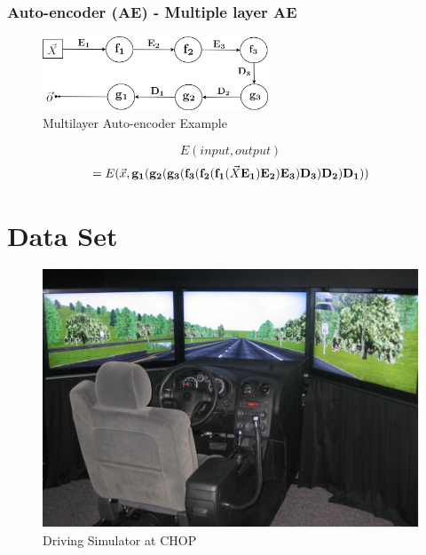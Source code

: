 \documentclass{beamer}
\begin{document}
\begin{frame}
\frametitle{Auto-encoder (AE) - Multiple layer AE}
\begin{figure}[t!]
    \centering
    \includegraphics[width=0.6\textwidth]{../paper/pictures/figures/example_MAE.png}
    \caption{Multilayer Auto-encoder Example}
    \label{fig:example_MAE}
\end{figure}

$$E(input, output)$$
$$=E(\vec{x}, \bold{g_1}(\bold{g_2}(\bold{g_3}(\bold{f_3}(\bold{f_2}(\bold{f_1}(\vec{X}\bold{E_1})\bold{E_2})\bold{E_3})\bold{D_3})\bold{D_2})\bold{D_1}))$$
\end{frame}


\section{Data Set}
\begin{frame}
\begin{figure}[t!]
    \centering
    \includegraphics[width=\textwidth]{figure-simulator-cropped}
    \caption{Driving Simulator at CHOP}
    \label{fig:simulator}
\end{figure}
\end{frame}
\end{document}
